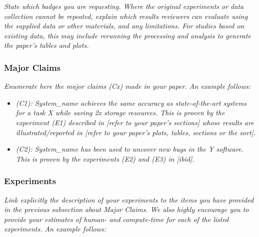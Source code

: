 \textit{State which badges you are requesting. Where the original experiments or data collection cannot be repeated, explain which results reviewers can evaluate using the supplied data or other materials, and any limitations. For studies based on existing data, this may include rerunning the processing and analysis to generate the paper's tables and plots.}

\subsubsection{Major Claims}
\textit{Enumerate here the major claims (Cx) made in your paper. An example follows:}\\

\begin{itemize}
    \item \textit{(C1): System\_name achieves the same accuracy as state-of-the-art systems for a task X while saving 2x storage resources. This is proven by the experiment (E1) described in [refer to your paper's sections] whose results are illustrated/reported in [refer to your paper's plots, tables, sections or the sort].}
    \item \textit{(C2): System\_name has been used to uncover new bugs in the Y software. This is proven by the experiments (E2) and (E3) in [ibid].}
\end{itemize}

\subsubsection{Experiments}
\textit{Link explicitly the description of your experiments to the items you have provided in the previous subsection about Major Claims. We also highly encourage you to provide your estimates of human- and compute-time for each of the listed experiments. An example follows:}
~\\

